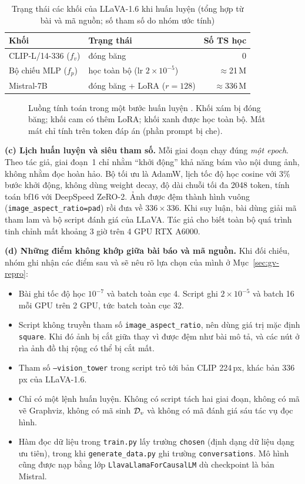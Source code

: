 \begin{table}[t]
\centering
\caption{Trạng thái các khối của LLaVA-1.6 khi huấn luyện \GV{} (tổng hợp từ bài và mã nguồn; số tham số do nhóm ước tính)}
\label{tab:gv-trainable}
\footnotesize
\setlength{\tabcolsep}{4pt}
\begin{tabular}{@{}llr@{}}
\toprule
Khối & Trạng thái & Số TS học \\
\midrule
CLIP-L/14-336 ($f_v$) & đóng băng & 0 \\
Bộ chiếu MLP ($f_p$) & học toàn bộ (lr $2{\times}10^{-5}$) & $\approx$21\,M \\
Mistral-7B & đóng băng + LoRA ($r{=}128$) & $\approx$336\,M \\
\bottomrule
\end{tabular}
\end{table}

\begin{figure}[t]
\centering

\caption{Luồng tính toán trong một bước huấn luyện \GV{}. Khối xám bị đóng băng; khối cam có thêm LoRA; khối xanh được học toàn bộ. Mất mát chỉ tính trên token đáp án (phần prompt bị che).}
\label{fig:gv-arch}
\end{figure}

\textbf{(c) Lịch huấn luyện và siêu tham số.} Mỗi giai đoạn chạy đúng \emph{một epoch}. Theo tác giả, giai đoạn~1 chỉ nhằm ``khởi động'' khả năng bám vào nội dung ảnh, không nhằm đọc hoàn hảo. Bộ tối ưu là AdamW, lịch tốc độ học cosine với 3\% bước khởi động, không dùng weight decay, độ dài chuỗi tối đa 2048 token, tính toán bf16 với DeepSpeed ZeRO-2. Ảnh được đệm thành hình vuông (\texttt{image\_aspect\_ratio=pad}) rồi đưa về $336\times336$. Khi suy luận, bài dùng giải mã tham lam và bộ script đánh giá của LLaVA. Tác giả cho biết toàn bộ quá trình tinh chỉnh mất khoảng 3 giờ trên 4 GPU RTX A6000.

\textbf{(d) Những điểm không khớp giữa bài báo và mã nguồn.} Khi đối chiếu, nhóm ghi nhận các điểm sau và sẽ nêu rõ lựa chọn của mình ở Mục~\ref{sec:gv-repro}:
\begin{itemize}
\item Bài ghi tốc độ học $10^{-7}$ và batch toàn cục 4. Script ghi $2\times10^{-5}$ và batch 16 mỗi GPU trên 2 GPU, tức batch toàn cục 32.
\item Script không truyền tham số \texttt{image\_aspect\_ratio}, nên dùng giá trị mặc định \texttt{square}. Khi đó ảnh bị cắt giữa thay vì được đệm như bài mô tả, và các nút ở rìa ảnh đồ thị rộng có thể bị cắt mất.
\item Tham số \texttt{--vision\_tower} trong script trỏ tới bản CLIP 224\,px, khác bản 336\,px của LLaVA-1.6.
\item Chỉ có một lệnh huấn luyện. Không có script tách hai giai đoạn, không có mã vẽ Graphviz, không có mã sinh $\mathcal{D}_v$ và không có mã đánh giá sáu tác vụ đọc hình.
\item Hàm đọc dữ liệu trong \texttt{train.py} lấy trường \texttt{chosen} (định dạng dữ liệu dạng ưu tiên), trong khi \texttt{generate\_data.py} ghi trường \texttt{conversations}. Mô hình cũng được nạp bằng lớp \texttt{LlavaLlamaForCausalLM} dù checkpoint là bản Mistral.
\end{itemize}

